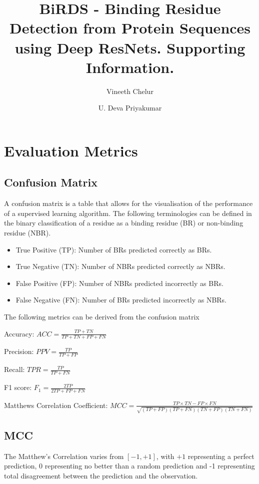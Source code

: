\documentclass[journal=jcisd8,manuscript=article]{achemso}
\author{Vineeth Chelur}
\author{U. Deva Priyakumar}
\affiliation[IIIT-H]
{Center for Computational Natural Sciences \& Bioinformatics \\ International Institute of Information Technology \\ Hyderabad - 500032, India}
\title[BiRDS - Binding Residue Detection from Protein Sequences using Deep ResNets. Supporting Information.]
  {BiRDS - Binding Residue Detection from Protein Sequences using Deep ResNets. Supporting Information.}
\begin{document}
\thispagestyle{empty}

\tableofcontents

\listoftables


\newpage

\section{Evaluation Metrics}
\subsection{Confusion Matrix}
A confusion matrix is a table that allows for the visualisation of the performance of a supervised learning algorithm. The following terminologies can be defined in the binary classification of a residue as a binding residue (BR) or non-binding residue (NBR).
\begin{itemize}
    \item True Positive (TP): Number of BRs predicted correctly as BRs.
    \item True Negative (TN): Number of NBRs predicted correctly as NBRs.
    \item False Positive (FP): Number of NBRs predicted incorrectly as BRs.
    \item False Negative (FN): Number of BRs predicted incorrectly as NBRs.
\end{itemize}

\noindent The following metrics can be derived from the confusion matrix

Accuracy: ${ACC} = \frac{TP + TN}{TP + TN + FP + FN}$

Precision: ${PPV} = \frac{TP}{TP + FP}$

Recall: ${TPR} = \frac{TP}{TP + FN}$

F1 score: ${F_1} = \frac{2TP}{2TP + FP + FN}$

Matthews Correlation Coefficient: ${MCC} = \frac{TP \times TN - FP \times FN}{\sqrt{(TP + FP)(TP + FN)(TN + FP)(TN + FN)}}$

\subsection{MCC}
\quad The Matthew's Correlation varies from $[-1, +1]$, with $+1$ representing a perfect prediction, 0 representing no better than a random prediction and -1 representing total disagreement between the prediction and the observation.
\end{document}
